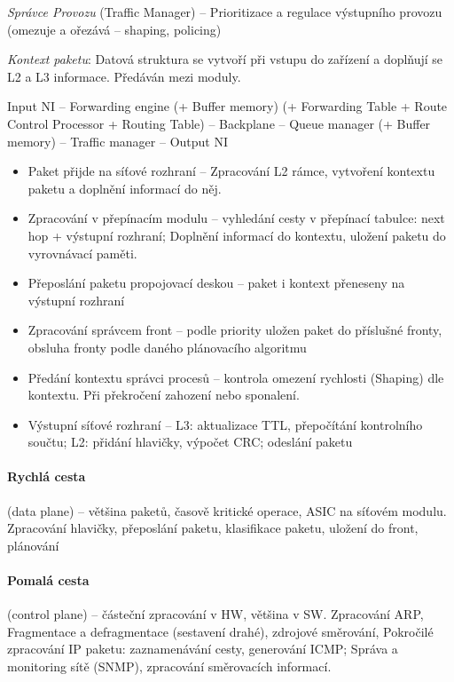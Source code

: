 \documentclass[a4paper, 11pt]{report}
\begin{document}
\emph{Správce Provozu} (Traffic Manager) -- Prioritizace a regulace výstupního provozu (omezuje a ořezává -- shaping, policing)

\emph{Kontext paketu}: Datová struktura se vytvoří při vstupu do zařízení a doplňují se L2 a L3 informace. Předáván mezi moduly.

Input NI -- Forwarding engine (+ Buffer memory) (+ Forwarding Table + Route Control Processor + Routing Table) -- Backplane -- Queue manager (+ Buffer memory) -- Traffic manager -- Output NI
\begin{itemize}
	\item Paket přijde na síťové rozhraní -- Zpracování L2 rámce, vytvoření kontextu paketu a doplnění informací do něj.
	\item Zpracování v přepínacím modulu -- vyhledání cesty v přepínací tabulce: next hop + výstupní rozhraní; Doplnění informací do kontextu, uložení paketu do vyrovnávací paměti.
	\item Přeposlání paketu propojovací deskou -- paket i kontext přeneseny na výstupní rozhraní
	\item Zpracování správcem front -- podle priority uložen paket do příslušné fronty, obsluha fronty podle daného plánovacího algoritmu
	\item Předání kontextu správci procesů -- kontrola omezení rychlosti (Shaping) dle kontextu. Při překročení zahození nebo sponalení.
	\item Výstupní síťové rozhraní -- L3: aktualizace TTL, přepočítání kontrolního součtu; L2: přidání hlavičky, výpočet CRC; odeslání paketu
\end{itemize}

\paragraph{Rychlá cesta} (data plane) -- většina paketů, časově kritické operace, ASIC na síťovém modulu. Zpracování hlavičky, přeposlání paketu, klasifikace paketu, uložení do front, plánování

\paragraph{Pomalá cesta} (control plane) -- částeční zpracování v HW, většina v SW. Zpracování ARP, Fragmentace a defragmentace (sestavení drahé), zdrojové směrování, Pokročilé zpracování IP paketu: zaznamenávání cesty, generování ICMP; Správa a monitoring sítě (SNMP), zpracování směrovacích informací.
\end{document}
